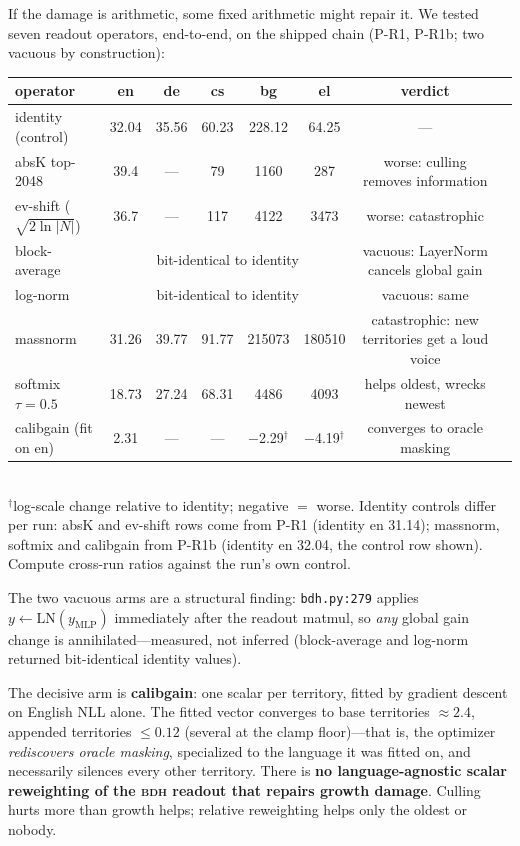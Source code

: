 \documentclass[11pt]{article}
\theoremstyle{definition}\newtheorem{definition}{Definition}
\theoremstyle{remark}\newtheorem{remark}{Remark}
\newcommand{\BDH}{\textsc{bdh}}
\begin{document}
If the damage is arithmetic, some fixed arithmetic might repair it. We tested seven
readout operators, end-to-end, on the shipped chain (P-R1, P-R1b; two vacuous by
construction):

\begin{center}\small
\begin{tabular}{lccccccl}
\toprule
operator & en & de & cs & bg & el & verdict \\
\midrule
identity (control) & 32.04 & 35.56 & 60.23 & 228.12 & 64.25 & --- \\
absK top-2048 & 39.4 & --- & 79 & 1160 & 287 & worse: culling removes information \\
ev-shift ($\sqrt{2\ln|N|}$) & 36.7 & --- & 117 & 4122 & 3473 & worse: catastrophic \\
block-average & \multicolumn{5}{c}{bit-identical to identity} & vacuous: LayerNorm cancels global gain \\
log-norm & \multicolumn{5}{c}{bit-identical to identity} & vacuous: same \\
massnorm & 31.26 & 39.77 & 91.77 & 215073 & 180510 & catastrophic: new territories get a loud voice \\
softmix $\tau{=}0.5$ & 18.73 & 27.24 & 68.31 & 4486 & 4093 & helps oldest, wrecks newest \\
calibgain (fit on en) & 2.31 & --- & --- & $-$2.29$^\dagger$ & $-$4.19$^\dagger$ & converges to oracle masking \\
\bottomrule
\end{tabular}\\
\footnotesize $^\dagger$log-scale change relative to identity; negative $=$ worse. Identity controls differ per run: absK and ev-shift rows come from P-R1 (identity en 31.14); massnorm, softmix and calibgain from P-R1b (identity en 32.04, the control row shown). Compute cross-run ratios against the run's own control.
\end{center}

The two vacuous arms are a structural finding: \texttt{bdh.py:279} applies
$y \leftarrow \mathrm{LN}(y_{\mathrm{MLP}})$ immediately after the readout matmul, so
\emph{any} global gain change is annihilated---measured, not inferred (block-average and
log-norm returned bit-identical identity values).

The decisive arm is \textbf{calibgain}: one scalar per territory, fitted by gradient descent
on English NLL alone. The fitted vector converges to base territories $\approx 2.4$,
appended territories $\le 0.12$ (several at the clamp floor)---that is, the optimizer
\emph{rediscovers oracle masking}, specialized to the language it was fitted on, and
necessarily silences every other territory. There is \textbf{no language-agnostic scalar
reweighting of the \BDH{} readout that repairs growth damage}. Culling hurts more than
growth helps; relative reweighting helps only the oldest or nobody.
\end{document}
